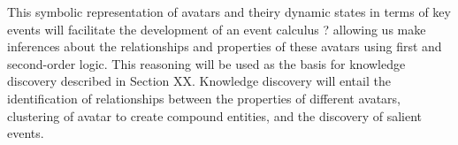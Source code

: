 








This symbolic representation of avatars and theiry dynamic states in terms of key events will facilitate the development of an event calculus ? allowing us make inferences about the relationships and properties of these avatars using first and second-order logic. This reasoning will be used as the basis for knowledge discovery described in Section XX. Knowledge discovery will entail the identification of relationships between the properties of different avatars, clustering of avatar to create compound entities, and the discovery of salient events. 


